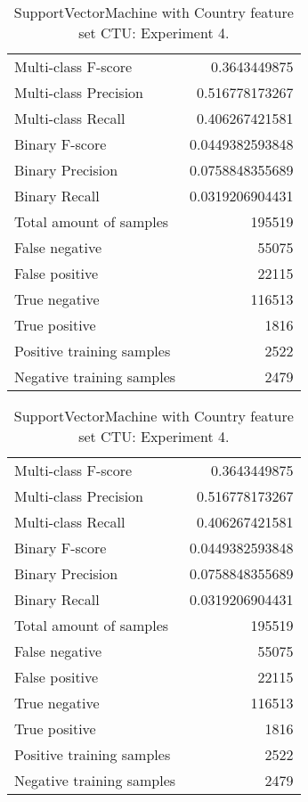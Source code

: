 \begin{table}[H]
\begin{minipage}{0.5\textwidth}
\caption{SupportVectorMachine with Country feature set CTU: Experiment 3.}
\centering
\begin{tabular}{l r}
\toprule
Multi-class F-score & 0.3643449875 \\
Multi-class Precision & 0.516778173267 \\
Multi-class Recall & 0.406267421581 \\
\midrule
Binary F-score & 0.0449382593848 \\
Binary Precision & 0.0758848355689 \\
Binary Recall & 0.0319206904431 \\
\midrule
Total amount of samples & 195519 \\
False negative & 55075 \\
False positive & 22115 \\
True negative & 116513 \\
True positive & 1816 \\
\midrule
Positive training samples & 2522 \\
Negative training samples & 2479 \\
\bottomrule
\end{tabular}
\end{minipage}
\hfillx
\begin{minipage}{0.5\textwidth}
\caption{SupportVectorMachine with Country feature set CTU: Experiment 4.}
\centering
\begin{tabular}{l r}
\toprule
Multi-class F-score & 0.3643449875 \\
Multi-class Precision & 0.516778173267 \\
Multi-class Recall & 0.406267421581 \\
\midrule
Binary F-score & 0.0449382593848 \\
Binary Precision & 0.0758848355689 \\
Binary Recall & 0.0319206904431 \\
\midrule
Total amount of samples & 195519 \\
False negative & 55075 \\
False positive & 22115 \\
True negative & 116513 \\
True positive & 1816 \\
\midrule
Positive training samples & 2522 \\
Negative training samples & 2479 \\
\bottomrule
\end{tabular}
\end{minipage}
\end{table}
